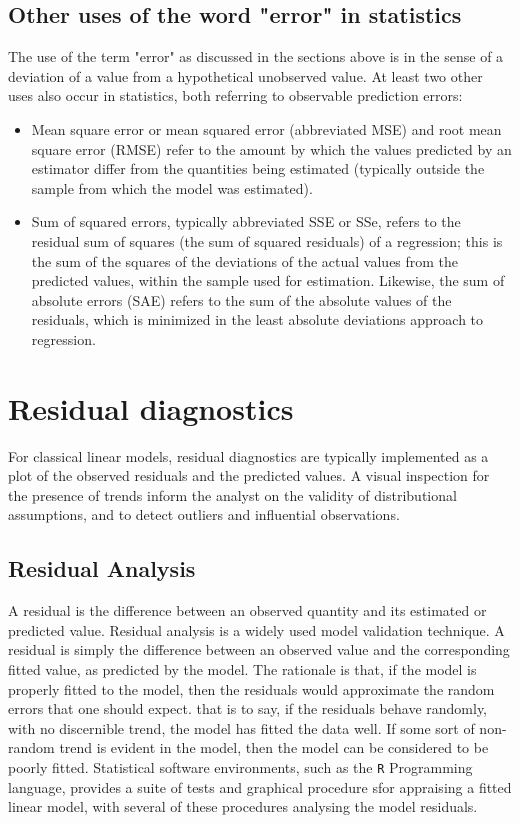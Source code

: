 \documentclass[Main.tex]{subfiles}
\begin{document}

\subsection{Other uses of the word "error" in statistics}

The use of the term "error" as discussed in the sections above is in the sense of a deviation of a value from a hypothetical unobserved value. At least two other uses also occur in statistics, both referring to observable prediction errors:

\begin{itemize}
	\item Mean square error or mean squared error (abbreviated MSE) and root mean square error (RMSE) refer to the amount by which the values predicted by an estimator differ from the quantities being estimated (typically outside the sample from which the model was estimated).
	
	\item 
	Sum of squared errors, typically abbreviated SSE or SSe, refers to the residual sum of squares (the sum of squared residuals) of a regression; this is the sum of the squares of the deviations of the actual values from the predicted values, within the sample used for estimation. Likewise, the sum of absolute errors (SAE) refers to the sum of the absolute values of the residuals, which is minimized in the least absolute deviations approach to regression.
	
\end{itemize}

	\section{Residual diagnostics} %
	For classical linear models, residual diagnostics are typically implemented as a plot of the observed residuals and the predicted values. A visual inspection for the presence of trends inform the analyst on the validity of distributional assumptions, and to detect outliers and influential observations.
	
			\subsection{Residual Analysis}
			A residual is the difference between an observed quantity and its
			estimated or predicted value. 
			Residual analysis is a widely used model validation technique. A residual is simply the difference between an observed value and the corresponding fitted value, as predicted by the model. The rationale is that, if the model is properly fitted to the model, then the residuals would approximate the random errors that one should expect.
			that is to say, if the residuals behave randomly, with no discernible trend, the model has fitted the data well. If some sort of non-random trend is evident in the model, then the model can be considered to be poorly fitted.
			Statistical software environments, such as the \texttt{R} Programming language, provides a suite of tests and graphical procedure sfor appraising a fitted linear model, with several 
			of these procedures analysing the model residuals.
			
\end{document}

